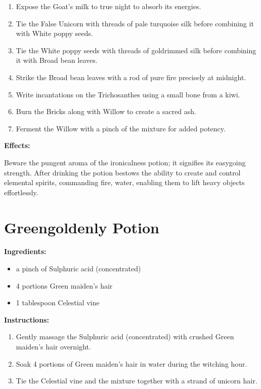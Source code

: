 \documentclass{article}
\begin{document}
\begin{enumerate}
  \item Expose the Goat's milk to true night to absorb its energies.
  \item Tie the False Unicorn with threads of pale turquoise silk before combining it with White poppy seeds.
  \item Tie the White poppy seeds with threads of goldrimmed silk before combining it with Broad bean leaves.
  \item Strike the Broad bean leaves with a rod of pure fire precisely at midnight.
  \item Write incantations on the Trichosanthes using a small bone from a kiwi.
  \item Burn the Bricks along with Willow to create a sacred ash.
  \item Ferment the Willow with a pinch of the mixture for added potency.
\end{enumerate}

\textbf{Effects:}

Beware the pungent aroma of the ironicalness potion; it signifies its easygoing strength. After drinking the potion bestows the ability to create and control elemental spirits, commanding fire, water, enabling them to lift heavy objects effortlessly.

\newpage
\section*{Greengoldenly Potion}

\textbf{Ingredients:}

\begin{itemize}
  \item a pinch of Sulphuric acid (concentrated)
  \item 4 portions Green maiden's hair
  \item 1 tablespoon Celestial vine
\end{itemize}

\textbf{Instructions:}

\begin{enumerate}
  \item Gently massage the Sulphuric acid (concentrated) with crushed Green maiden's hair overnight.
  \item Soak 4 portions of Green maiden's hair in water during the witching hour.
  \item Tie the Celestial vine and the mixture together with a strand of unicorn hair.
\end{enumerate}
\end{document}
